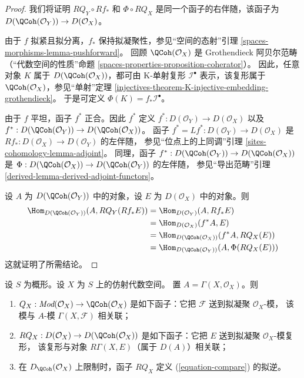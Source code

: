 \begin{proof}
我们将证明 $RQ_Y \circ Rf_*$ 和 $\Phi \circ RQ_X$
是同一个函子的右伴随，该函子为
$D(\QCoh(\mathcal{O}_Y)) \to D(\mathcal{O}_X)$。

\medskip\noindent
由于 $f$ 拟紧且拟分离，$f_*$ 保持拟凝聚性，参见“空间的态射”引理
\ref{spaces-morphisms-lemma-pushforward}。
回顾 $\QCoh(\mathcal{O}_X)$ 是 Grothendieck 阿贝尔范畴（“代数空间的性质”命题
\ref{spaces-properties-proposition-coherator}）。
因此，任意对象 $K$ 属于 $D(\QCoh(\mathcal{O}_X))$，都可由
K-单射复形 $\mathcal{I}^\bullet$ 表示，该复形属于 $\QCoh(\mathcal{O}_X)$，参见“单射”定理
\ref{injectives-theorem-K-injective-embedding-grothendieck}。
于是可定义 $\Phi(K) = f_*\mathcal{I}^\bullet$。

\medskip\noindent
由于 $f$ 平坦，函子 $f^*$ 正合。因此 $f^*$ 定义
$f^* : D(\mathcal{O}_Y) \to D(\mathcal{O}_X)$ 以及
$f^* : D(\QCoh(\mathcal{O}_Y)) \to D(\QCoh(\mathcal{O}_X))$。
函子 $f^* = Lf^* : D(\mathcal{O}_Y) \to D(\mathcal{O}_X)$
是 $Rf_* : D(\mathcal{O}_X) \to D(\mathcal{O}_Y)$ 的左伴随，
参见“位点上的上同调”引理 \ref{sites-cohomology-lemma-adjoint}。
同理，函子
$f^* : D(\QCoh(\mathcal{O}_Y)) \to D(\QCoh(\mathcal{O}_X))$
是 $\Phi : D(\QCoh(\mathcal{O}_X)) \to D(\QCoh(\mathcal{O}_Y))$ 的左伴随，
参见“导出范畴”引理 \ref{derived-lemma-derived-adjoint-functors}。

\medskip\noindent
设 $A$ 为 $D(\QCoh(\mathcal{O}_Y))$ 中的对象，设 $E$ 为
$D(\mathcal{O}_X)$ 中的对象。则
\begin{align*}
\Hom_{D(\QCoh(\mathcal{O}_Y))}(A, RQ_Y(Rf_*E))
& =
\Hom_{D(\mathcal{O}_Y)}(A, Rf_*E) \\
& =
\Hom_{D(\mathcal{O}_X)}(f^*A, E) \\
& =
\Hom_{D(\QCoh(\mathcal{O}_X))}(f^*A, RQ_X(E)) \\
& =
\Hom_{D(\QCoh(\mathcal{O}_Y))}(A, \Phi(RQ_X(E)))
\end{align*}
这就证明了所需结论。
\end{proof}

\begin{lemma}
\label{lemma-affine-coherator}
设 $S$ 为概形。设 $X$ 为 $S$ 上的仿射代数空间。
置 $A = \Gamma(X, \mathcal{O}_X)$。则
\begin{enumerate}
\item $Q_X : \textit{Mod}(\mathcal{O}_X) \to \QCoh(\mathcal{O}_X)$
是如下函子：它把 $\mathcal{F}$ 送到拟凝聚 $\mathcal{O}_X$-模，
该模与 $A$-模 $\Gamma(X, \mathcal{F})$ 相关联；
\item $RQ_X : D(\mathcal{O}_X) \to D(\QCoh(\mathcal{O}_X))$
是如下函子：它把 $E$ 送到拟凝聚 $\mathcal{O}_X$-模复形，
该复形与对象 $R\Gamma(X, E)$（属于 $D(A)$）相关联；
\item 在 $D_\QCoh(\mathcal{O}_X)$ 上限制时，函子 $RQ_X$ 定义
(\ref{equation-compare}) 的拟逆。
\end{enumerate}
\end{lemma}

